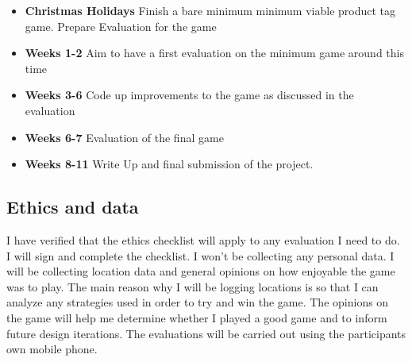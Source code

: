 \documentclass[11pt]{article}
\begin{document}
\begin{itemize}
    \tightlist
    \item \textbf{Christmas Holidays} Finish a bare minimum minimum viable product tag game. Prepare Evaluation for the game
    \item \textbf{Weeks 1-2} Aim to have a first evaluation on the minimum game around this time
    \item \textbf{Weeks 3-6} Code up improvements to the game as discussed in the evaluation
    \item \textbf{Weeks 6-7} Evaluation of the final game
    \item \textbf{Weeks 8-11} Write Up and final submission of the project.
\end{itemize}


    
\subsection{Ethics and data}\label{ethics}

I have verified that the ethics checklist will apply to any evaluation I need to do. I will sign and complete the checklist. I won't be collecting any personal
data. I will be collecting location data and general opinions on how enjoyable the game was to play. The main reason why I will be logging locations is so that
I can analyze any strategies used in order to try and win the game. The opinions on the game will help me determine whether I played a good game and to inform
future design iterations. The evaluations will be carried out using the participants own mobile phone.
   
\end{document}
